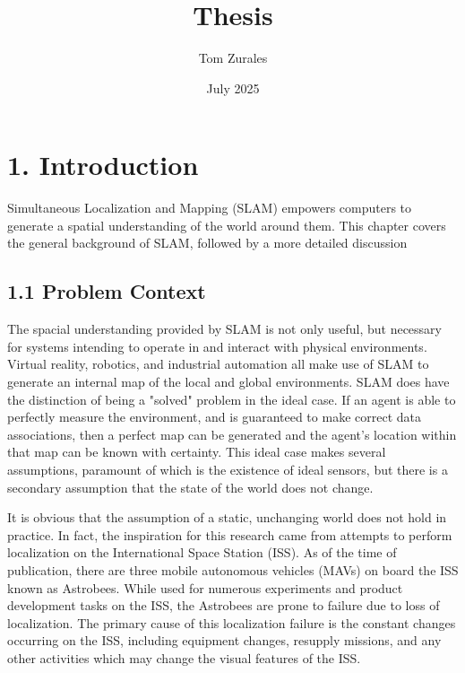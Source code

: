 \documentclass[12pt]{article}
\title{Thesis}
\author{Tom Zurales}
\date{July 2025}
\begin{document}
\doublespace

\maketitle

\section{1. Introduction}

Simultaneous Localization and Mapping (SLAM) empowers computers to generate a spatial understanding of the world around them. This chapter covers the general background of SLAM, followed by a more detailed discussion

\subsection{1.1 Problem Context}

The spacial understanding provided by SLAM is not only useful, but necessary for systems intending to operate in and interact with physical environments. Virtual reality, robotics, and industrial automation all make use of SLAM to generate an internal map of the local and global environments. SLAM does have the distinction of being a "solved" problem in the ideal case. If an agent is able to perfectly measure the environment, and is guaranteed to make correct data associations, then a perfect map can be generated and the agent's location within that map can be known with certainty. This ideal case makes several assumptions, paramount of which is the existence of ideal sensors, but there is a secondary assumption that the state of the world does not change.

It is obvious that the assumption of a static, unchanging world does not hold in practice. In fact, the inspiration for this research came from attempts to perform localization on the International Space Station (ISS). As of the time of publication, there are three mobile autonomous vehicles (MAVs) on board the ISS known as Astrobees. While used for numerous experiments and product development tasks on the ISS, the Astrobees are prone to failure due to loss of localization. The primary cause of this localization failure is the constant changes occurring on the ISS, including equipment changes, resupply missions, and any other activities which may change the visual features of the ISS.
\end{document}
